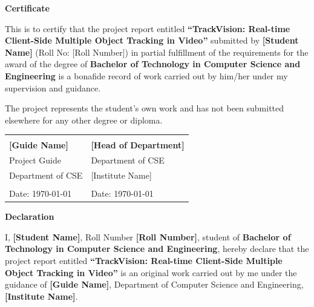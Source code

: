 \newpage
\thispagestyle{plain}
\begin{center}
    {\Large \bfseries \color{trackvisiondark} Certificate}\\[1cm]
\end{center}

\vspace{2cm}

\noindent This is to certify that the project report entitled \textbf{``TrackVision: Real-time Client-Side Multiple Object Tracking in Video''} submitted by \textbf{[Student Name]} (Roll No: [Roll Number]) in partial fulfillment of the requirements for the award of the degree of \textbf{Bachelor of Technology in Computer Science and Engineering} is a bonafide record of work carried out by him/her under my supervision and guidance.

\vspace{1.5cm}

\noindent The project represents the student's own work and has not been submitted elsewhere for any other degree or diploma.

\vspace{2cm}

\begin{tabular}{p{7cm} p{7cm}}
    \hrulefill & \hrulefill \\
    \textbf{[Guide Name]} & \textbf{[Head of Department]} \\
    Project Guide & Department of CSE \\
    Department of CSE & [Institute Name] \\
    [Institute Name] & \\
    Date: \today & Date: \today \\
\end{tabular}

\newpage

\thispagestyle{plain}
\begin{center}
    {\Large \bfseries \color{trackvisiondark} Declaration}\\[1cm]
\end{center}

\vspace{2cm}

\noindent I, \textbf{[Student Name]}, Roll Number \textbf{[Roll Number]}, student of \textbf{Bachelor of Technology in Computer Science and Engineering}, hereby declare that the project report entitled \textbf{``TrackVision: Real-time Client-Side Multiple Object Tracking in Video''} is an original work carried out by me under the guidance of \textbf{[Guide Name]}, Department of Computer Science and Engineering, \textbf{[Institute Name]}.

